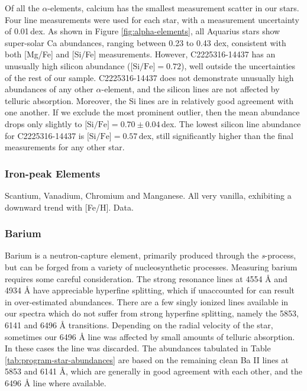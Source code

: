 \documentclass{emulateapj}
\begin{document}
Of all the $\alpha$-elements, calcium has the smallest measurement scatter in our stars. Four line measurements were used for each star, with a measurement uncertainty of 0.01\,dex. As shown in Figure \ref{fig:alpha-elements}, all Aquarius stars show super-solar Ca abundances, ranging between 0.23 to 0.43 dex, consistent with both [Mg/Fe] and [Si/Fe] measurements. However, C2225316-14437 has an unusually high silicon abundance ($\mbox{[Si/Fe]} = 0.72$), well outside the uncertainties of the rest of our sample. C2225316-14437 does not demonstrate unusually high abundances of any other $\alpha$-element, and the silicon lines are not affected by telluric absorption. Moreover, the Si lines are in relatively good agreement with one another. If we exclude the most prominent outlier, then the mean abundance drops only slightly to $\mbox{[Si/Fe]} = 0.70 \pm 0.04$\,dex. The lowest silicon line abundance for C2225316-14437 is $\mbox{[Si/Fe]} = 0.57$\,dex, still significantly higher than the final measurements for any other star.


\subsubsection{Iron-peak Elements}
Scantium, Vanadium, Chromium and Manganese. All very vanilla, exhibiting a downward trend with [Fe/H].
Data.


\subsubsection{Barium}
Barium is a neutron-capture element, primarily produced through the \textit{s}-process, but can be forged from a variety of nucleosynthetic processes. Measuring barium requires some careful consideration. The strong resonance lines at 4554 {\AA} and 4934 {\AA} have appreciable hyperfine splitting, which if unaccounted for can result in over-estimated abundances. There are a few singly ionized lines available in our spectra which do not suffer from strong hyperfine splitting, namely the 5853, 6141 and 6496 {\AA} transitions. Depending on the radial velocity of the star, sometimes our 6496 {\AA} line was affected by small amounts of telluric absorption. In these cases the line was discarded. The abundances tabulated in Table \ref{tab:program-star-abundances} are based on the remaining clean Ba \textsc{II} lines at 5853 and 6141 {\AA}, which are generally in good agreement with each other, and the 6496 {\AA} line where available.
\end{document}
